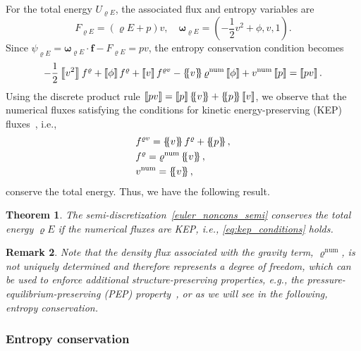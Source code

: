 \documentclass[]{scrartcl}
\newcommand*{\ldblbrace}{\{\mskip-5mu \left \{}
\newcommand*{\rdblbrace}{ \}\mskip-5mu \right \}}
\newcommand{\mean}[1]{\left\ldblbrace #1 \right\rdblbrace}
\renewcommand{\vec}[1]{\boldsymbol{#1}}
\newcommand{\jump}[1]{\left\llbracket #1  \right\rrbracket}
\newtheorem{theorem}{Theorem}[section]
\newtheorem{remark}[theorem]{Remark}
\theoremstyle{definition}
\begin{document}
For the total energy $U_{\varrho E}$, the associated flux and entropy variables are
\begin{equation}
F_{\varrho E} = (\varrho E  + p) v, \quad \vec{\omega}_{\varrho E} = \left (-\frac{1}{2}v^2 + \phi, v, 1 \right ).
\end{equation}
Since $\psi_{\varrho E} = \vec{\omega}_{\varrho E} \cdot \vec{f} - F_{\varrho E} = pv$, the entropy conservation condition becomes
\begin{equation}
\begin{aligned}
    -\frac{1}{2}\jump{v^2} f^{\varrho} + \jump{\phi}f^{\varrho} + \jump{v}f^{\varrho v} - \mean{v}\varrho^{\mathrm{num}}\jump{\phi} + v^{\mathrm{num}}\jump{p} = \jump{pv}.
\end{aligned}
\end{equation}
Using the discrete product rule $\jump{pv} = \jump{p}\mean{v} + \mean{p}\jump{v}$, we observe that the numerical fluxes satisfying the conditions for kinetic energy-preserving (KEP) fluxes~\cite{Jameson2008,Kuya2018,Ranocha2020,Ranocha2022, ranocha2018thesis}, i.e.,
\begin{equation}
\label{eq:kep_conditions}
\begin{aligned}
& f^{\varrho v} = \mean{v} f^{\varrho} + \mean{p},\\
& f^{\varrho} = \varrho^{\mathrm{num}} \mean{v},\\
& v^{\mathrm{num}} = \mean{v},
\end{aligned}
\end{equation}
conserve the total energy.
Thus, we have the following result.
\begin{theorem}
\label{thm:total_energy_conservation}
    The semi-discretization~\eqref{euler_noncons_semi} conserves the total energy $\varrho E$ if the numerical fluxes are KEP, i.e., \eqref{eq:kep_conditions} holds.
\end{theorem}
\begin{remark}
Note that the density flux associated with the gravity term, $\varrho^{\mathrm{num}}$, is not uniquely determined and therefore represents a degree of freedom, which can be used to enforce additional structure-preserving properties, e.g., the pressure-equilibrium-preserving (PEP) property~\cite{artiano2025structurepreservinghighordermethodscompressible,Shima2021,Ranocha2022}, or as we will see in the following, entropy conservation.
\end{remark}
\subsubsection{Entropy conservation}
\end{document}
